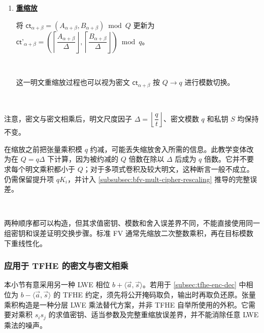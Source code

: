 \begin{tcolorbox}[title={\textbf{\tboxlabel{\ref*{subsubsec:bfv-mult-cipher-summary}} BFV 的密文与密文相乘}}]
\begin{enumerate}
$ \textsf{ct}_{\alpha + \beta} = \textsf{ct}_{\alpha} + \textsf{ct}_{\beta}$

$ $

于是，以下性质成立：

$\phi_S(\textsf{ct}_{\alpha+\beta})\equiv(\Delta M^{\langle1\rangle}+E^{\langle1\rangle}+qK_1)(\Delta M^{\langle2\rangle}+E^{\langle2\rangle}+qK_2)+E_{\rm rl}\pmod Q$。

$ $




\item \textbf{\underline{重缩放}}

将 $\textsf{ct}_{\alpha + \beta} = (A_{\alpha + \beta}, B_{\alpha + \beta}) \bmod Q$ 更新为 $\textsf{ct'}_{\alpha + \beta} = \left(\left\lceil\dfrac{A_{\alpha + \beta}}{\Delta}\right\rfloor, \left\lceil\dfrac{B_{\alpha + \beta}}{\Delta}\right\rfloor\right) \bmod q$。

$ $

这一明文重缩放过程也可以视为密文 $\textsf{ct}_{\alpha + \beta}$ 按 $Q \rightarrow q$ 进行模数切换。


$ $

\end{enumerate}

注意，密文与密文相乘后，明文尺度因子 $\Delta=\left\lfloor\dfrac{q}{t}\right\rfloor$、密文模数 $q$ 和私钥 $S$ 均保持不变。



\end{tcolorbox}


在缩放之前把张量乘积模 $q$ 约减，可能丢失缩放舍入所需的信息。此教学变体改为在 $Q=q\Delta$ 下计算，因为被约减的 $Q$ 倍数在除以 $\Delta$ 后成为 $q$ 倍数。它并不要求每个明文乘积都小于 $Q$；对于多项式卷积及较大明文，这种断言一般不成立。仍需保留提升项 $qK_i$，并计入 \autoref{subsubsec:bfv-mult-cipher-rescaling} 推导的完整误差。

$ $

两种顺序都可以构造，但其求值密钥、模数和舍入误差界不同，不能直接使用同一组密钥和误差证明交换步骤。标准 FV 通常先缩放二次整数乘积，再在目标模数下重线性化。



\subsubsection{应用于 TFHE 的密文与密文相乘}
\label{subsubsec:bfv-mult-cipher-tfhe}

本小节有意采用另一种 LWE 相位 $b+\langle\vec a,\vec s\rangle$。若用于 \autoref{subsec:tfhe-enc-dec} 中相位为 $b-\langle\vec a,\vec s\rangle$ 的 TFHE 约定，须先将公开掩码取负，输出时再取负还原。张量乘积构造是一种分层 LWE 乘法替代方案，并非 TFHE 自举所使用的外积。它需要对乘积 $s_i s_j$ 的求值密钥、适当参数及完整重缩放误差界，并不能消除任意 LWE 乘法的噪声。


